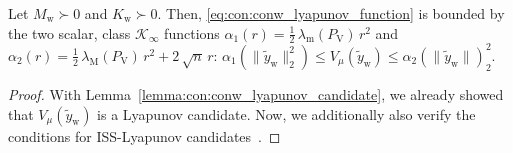 \begin{lemma}\label{lemma:con:iss_lyapunov_bounds}
    Let $M_\mathrm{w} \succ 0$ and $K_\mathrm{w} \succ 0$. Then, \eqref{eq:con:conw_lyapunov_function} is bounded by the two scalar, class $\mathcal{K}_\infty$ functions $\alpha_1(r)=\frac{1}{2} \, \lambda_\mathrm{m}(P_\mathrm{V})  \, r^2$ and $\alpha_2(r)=\frac{1}{2} \, \lambda_\mathrm{M}(P_\mathrm{V}) \, r^2 + 2 \, \sqrt{n} \, r$: $ \alpha_1(\lVert \tilde{y}_\mathrm{w} \rVert_2^2) \leq V_\mu(\tilde{y}_\mathrm{w}) \leq \alpha_2(\lVert \tilde{y}_\mathrm{w} \rVert)_2^2$.
\end{lemma}
\begin{proof}
    With Lemma~\ref{lemma:con:conw_lyapunov_candidate}, we already showed that  $V_\mu(\tilde{y}_\mathrm{w})$ is a Lyapunov candidate. Now, we additionally also verify the conditions for ISS-Lyapunov candidates~\citep{khalil2002nonlinear}.


\end{proof}
